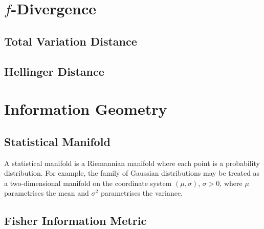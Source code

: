 \documentclass[11pt]{report} %
\begin{document}
\section{$f$-Divergence}

\subsection{Total Variation Distance}

\subsection{Hellinger Distance}

\section{Information Geometry}

\subsection{Statistical Manifold}

A statistical manifold is a Riemannian manifold where each point is a probability distribution. For example, the family of Gaussian distributions may be treated as a two-dimensional manifold on the coordinate system $\left(\mu, \sigma\right)$, $\sigma > 0$, where $\mu$ parametrises the mean and $\sigma^{2}$ parametrises the variance.

\subsection{Fisher Information Metric}
\end{document}
